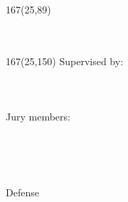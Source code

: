 \begin{titlepage}

\setlength{\TPHorizModule}{1mm}
\setlength{\TPVertModule}{\TPHorizModule}
\newlength{\backupparindent}
\setlength{\backupparindent}{\parindent}
\setlength{\parindent}{0mm}			
\begin{textblock}{167}(25,89)
    \vspace*{1mm}
    \huge
    \textbf{\doctitle \\}
    \Large
    \vspace*{5mm}
    \textit{\docsubtitle}\\
    \vspace*{10mm}
    \Large
    \me\\
\end{textblock}

\begin{textblock}{167}(25,150)
	\Large
	Supervised by: \\
    \hspace*{5cm}\firstSupervisor\\
     \hspace*{5cm}\secondSupervisor\\
     \hspace*{5cm}\thirdSupervisor\\
     
     \vspace*{1cm}
     Jury members:\\
     \hspace*{5cm}\firstCommitteeMember\\
	 \hspace*{5cm}\secondCommitteeMember\\
	 

\end{textblock}

\mbox{~} %
\vfill 
\begin{center}
\large
Defense \monthYear\\
\end{center}

\setlength{\parindent}{\backupparindent}

\end{titlepage} 